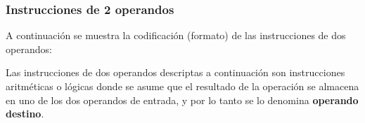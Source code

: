 \subsubsection{Instrucciones de 2 operandos}

A continuación se muestra la codificación (formato) de las instrucciones de dos operandos:



Las instrucciones de dos operandos descriptas a continuación son instrucciones aritméticas o lógicas donde se asume que el resultado de la operación se almacena en uno de los dos operandos de entrada, y por lo tanto se lo denomina \textbf{operando destino}.

